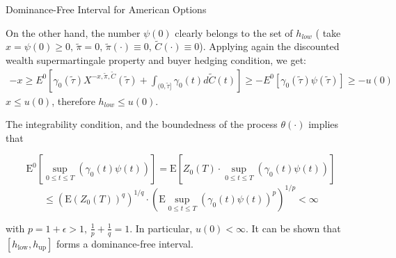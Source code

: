 \documentclass{beamer}
\begin{document}
\begin{frame}{Dominance-Free Interval for American Options}

    {\footnotesize \footnotesize
     On the other hand, the number \( \psi(0) \) clearly belongs to the set of $h_{low}$ ( 
     take \( x = \psi(0) \geq 0, \, \tilde{\pi} = 0, 
     \, \tilde{\pi}(\cdot) \equiv 0, \, \tilde{C}(\cdot) \equiv 0 \)). 
     \vspace{1em}
     Applying again the discounted wealth supermartingale property and buyer hedging condition, we get:
     \begin{align*}
        -x \geq E^0 \left[ \gamma_0(\tilde{\tau})X^{-x,\tilde{\pi},\tilde{C}}(\tilde{\tau}) + \int_{(0,\tilde{\tau}]} 
        \gamma_0(t)d\tilde{C}(t) \right] \geq -E^0[\gamma_0(\tilde{\tau})\psi(\tilde{\tau})] \geq -u(0)
     \end{align*}
     $x \leq  u(0)$, therefore $h_{low} \leq u(0)$.
    
     The integrability condition, and the boundedness of the process \( \theta(\cdot) \) implies that  

\[
\text{E}^0 \left[ \sup_{0 \leq t \leq T} (\gamma_0(t)\psi(t)) \right] = \text{E} \left[ Z_0(T) \cdot \sup_{0 \leq t \leq T} (\gamma_0(t)\psi(t)) \right]
\]
\[
\leq (\text{E}(Z_0(T))^q)^{1/q} \cdot \left( \text{E} \sup_{0 \leq t \leq T} (\gamma_0(t)\psi(t))^p \right)^{1/p} < \infty
\]

with \( p = 1 + \epsilon > 1, \, \frac{1}{p} + \frac{1}{q} = 1 \). In particular, $u(0) < \infty$. 
It can be shown that \( [h_{\text{low}}, h_{\text{up}}] \) forms a dominance-free interval.
    }
\end{frame} 
\end{document}
